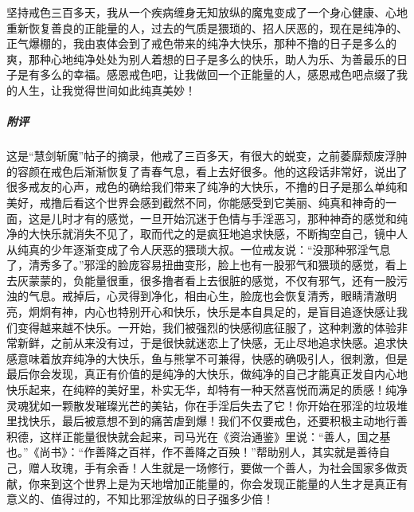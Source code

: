 \begin{case}
    坚持戒色三百多天，我从一个疾病缠身无知放纵的魔鬼变成了一个身心健康、心地重新恢复善良的正能量的人，过去的气质是猥琐的、招人厌恶的，现在是纯净的、正气爆棚的，我由衷体会到了戒色带来的纯净大快乐，那种不撸的日子是多么的爽，那种心地纯净处处为别人着想的日子是多么的快乐，助人为乐、为善最乐的日子是有多么的幸福。感恩戒色吧，让我做回一个正能量的人，感恩戒色吧点缀了我的人生，让我觉得世间如此纯真美妙！
    \subparagraph{附评} 这是“慧剑斩魔”帖子的摘录，他戒了三百多天，有很大的蜕变，之前萎靡颓废浮肿的容颜在戒色后渐渐恢复了青春气息，看上去好很多。他的这段话非常好，说出了很多戒友的心声，戒色的确给我们带来了纯净的大快乐，不撸的日子是那么单纯和美好，戒撸后看这个世界会感到截然不同，你能感受到它美丽、纯真和神奇的一面，这是儿时才有的感觉，一旦开始沉迷于色情与手淫恶习，那种神奇的感觉和纯净的大快乐就消失不见了，取而代之的是疯狂地追求快感，不断掏空自己，镜中人从纯真的少年逐渐变成了令人厌恶的猥琐大叔。一位戒友说：“没那种邪淫气息了，清秀多了。”邪淫的脸庞容易扭曲变形，脸上也有一股邪气和猥琐的感觉，看上去灰蒙蒙的，负能量很重，很多撸者看上去很脏的感觉，不仅有邪气，还有一股污浊的气息。戒掉后，心灵得到净化，相由心生，脸庞也会恢复清秀，眼睛清澈明亮，炯炯有神，内心也特别开心和快乐，快乐是本自具足的，是盲目追逐快感让我们变得越来越不快乐。一开始，我们被强烈的快感彻底征服了，这种刺激的体验非常新鲜，之前从来没有过，于是很快就迷恋上了快感，无止尽地追求快感。追求快感意味着放弃纯净的大快乐，鱼与熊掌不可兼得，快感的确吸引人，很刺激，但是最后你会发现，真正有价值的是纯净的大快乐，做纯净的自己才能真正发自内心地快乐起来，在纯粹的美好里，朴实无华，却特有一种天然喜悦而满足的质感！纯净灵魂犹如一颗散发璀璨光芒的美钻，你在手淫后失去了它！你开始在邪淫的垃圾堆里找快乐，最后被意想不到的痛苦虐到爆！我们不仅要戒色，还要积极主动地行善积德，这样正能量很快就会起来，司马光在《资治通鉴》里说：“善人，国之基也。”《尚书》：“作善降之百祥，作不善降之百殃！”帮助别人，其实就是善待自己，赠人玫瑰，手有余香！人生就是一场修行，要做一个善人，为社会国家多做贡献，你来到这个世界上是为天地增加正能量的，你会发现正能量的人生才是真正有意义的、值得过的，不知比邪淫放纵的日子强多少倍！
\end{case}

